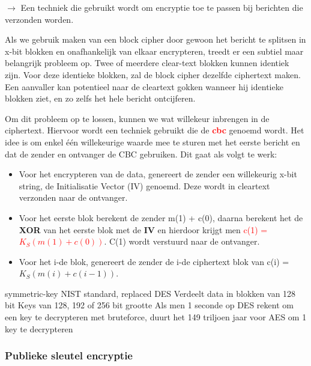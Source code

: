 
$\rightarrow$ Een techniek die gebruikt wordt om encryptie toe te passen bij berichten die verzonden worden.

\noindent Als we gebruik maken van een block cipher door gewoon het bericht te splitsen in x-bit blokken en onafhankelijk van elkaar encrypteren, treedt er een subtiel maar belangrijk probleem op. Twee of meerdere clear-text blokken kunnen identiek zijn. Voor deze identieke blokken, zal de block cipher dezelfde ciphertext maken. Een aanvaller kan potentieel naar de cleartext gokken wanneer hij identieke blokken ziet, en zo zelfs het hele bericht ontcijferen.

\noindent Om dit probleem op te lossen, kunnen we wat willekeur inbrengen in de ciphertext. Hiervoor wordt een techniek gebruikt die de \textcolor{red}{\textbf{\acrfull{cbc}}} genoemd wordt. Het idee is om enkel één willekeurige waarde mee te sturen met het eerste bericht en dat de zender en ontvanger de CBC gebruiken. Dit gaat als volgt te werk:

\begin{itemize}

\item Voor het encrypteren van de data, genereert de zender een willekeurig x-bit string, de Initialisatie Vector (IV) genoemd. Deze wordt in cleartext verzonden naar de ontvanger.

\item Voor het eerste blok berekent de zender m(1) + c(0), daarna berekent het de \textbf{XOR} van het eerste blok met de \textbf{IV} en hierdoor krijgt men \textcolor{red}{c(1) = $K_S(m(1) + c(0))$}. C(1) wordt verstuurd naar de ontvanger.

\item Voor het i-de blok, genereert de zender de i-de ciphertext blok van c(i) = $K_S(m(i) + c(i-1))$.

\end{itemize}

\bi
\itf symmetric-key NIST standard, replaced DES
\itf Verdeelt data in blokken van 128 bit
\itf Keys van 128, 192 of 256 bit grootte
\itf Als men 1 seconde op DES rekent om een key te decrypteren met bruteforce, duurt het 149 triljoen jaar voor AES om 1 key te decrypteren
\ei


\subsubsection{Publieke sleutel encryptie}

